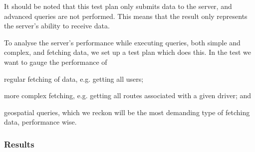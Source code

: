 It should be noted that this test plan only submits data to the server, and advanced queries are not performed.
This means that the result only represents the server's ability to receive data.

\bigskip
To analyse the server's performance while executing queries, both simple and complex, and fetching data, we set up a test plan which does this.
In the test we want to gauge the performance of
\begin{enumberate*}
    \item regular fetching of data, e.g. getting all users;
    \item more complex fetching, e.g. getting all routes associated with a given driver; and
    \item geospatial queries, which we reckon will be the most demanding type of fetching data, performance wise.
\end{enumberate*}

\subsubsection{Results}

